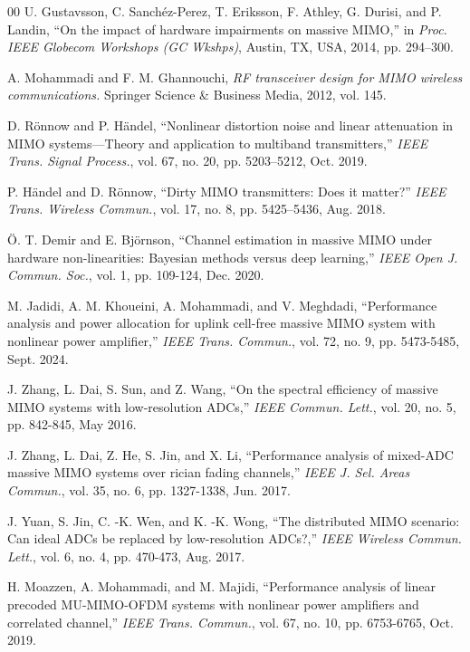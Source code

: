 \begin{thebibliography}{00}
U. Gustavsson, C. Sanch\'{e}z-Perez, T. Eriksson, F. Athley, G. Durisi, and P. Landin, ``On the impact of hardware impairments on massive MIMO,'' in \emph{Proc. IEEE Globecom Workshops (GC Wkshps)}, Austin, TX, USA, 2014, pp. 294--300.

A. Mohammadi and F. M. Ghannouchi, \textit{RF transceiver design for MIMO wireless communications.} Springer Science \& Business Media, 2012, vol. 145.

D. R{\"o}nnow and P. H{\"a}ndel, ``Nonlinear distortion noise and linear attenuation in MIMO systems---Theory and application to multiband transmitters,'' \emph{IEEE Trans. Signal Process.}, vol. 67, no. 20, pp. 5203--5212, Oct. 2019.

P. H{\"a}ndel and D. R{\"o}nnow, ``Dirty MIMO transmitters: Does it matter?'' \emph{IEEE Trans. Wireless Commun.}, vol. 17, no. 8, pp. 5425--5436, Aug. 2018.

{\"O}. T. Demir and E. Bj{\"o}rnson, ``Channel estimation in massive MIMO under hardware non-linearities: Bayesian methods versus deep learning,'' \emph{IEEE Open J. Commun. Soc.}, vol. 1, pp. 109-124, Dec. 2020.

M. Jadidi, A. M. Khoueini, A. Mohammadi, and V. Meghdadi, ``Performance analysis and power allocation for uplink cell-free massive MIMO system with nonlinear power amplifier,'' \emph{IEEE Trans. Commun.}, vol. 72, no. 9, pp. 5473-5485, Sept. 2024.

J. Zhang, L. Dai, S. Sun, and Z. Wang, ``On the spectral efficiency of massive MIMO systems with low-resolution ADCs,'' \textit{IEEE Commun. Lett.}, vol. 20, no. 5, pp. 842-845, May 2016.

J. Zhang, L. Dai, Z. He, S. Jin, and X. Li, ``Performance analysis of mixed-ADC massive MIMO systems over rician fading channels,'' \textit{IEEE J. Sel. Areas Commun.}, vol. 35, no. 6, pp. 1327-1338, Jun. 2017.

J. Yuan, S. Jin, C. -K. Wen, and K. -K. Wong, ``The distributed MIMO scenario: Can ideal ADCs be replaced by low-resolution ADCs?,'' \textit{IEEE Wireless Commun. Lett.}, vol. 6, no. 4, pp. 470-473, Aug. 2017.

H. Moazzen, A. Mohammadi, and M. Majidi, ``Performance analysis of linear precoded MU-MIMO-OFDM systems with nonlinear power amplifiers and correlated channel,'' \textit{IEEE Trans. Commun.}, vol. 67, no. 10, pp. 6753-6765, Oct. 2019.


\end{thebibliography}
